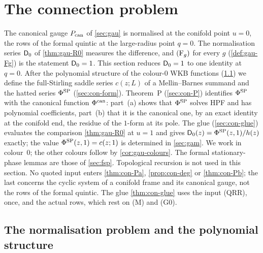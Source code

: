 
\section{The connection problem}
\label{sec:con}

The canonical gauge $P_{\mathrm{can}}$ of \cref{sec:gau} is normalised at the conifold point $u=0$, the rows of the formal quintic at the large-radius point $q=0$. The normalisation series $\mathsf{D}_0$ of \cref{thm:gau-R0} measures the difference, and $(\mathrm{F}_{g})$ for every $g$ (\cref{def:gau-Fg}) is the statement $\mathsf{D}_0=1$. This section reduces $\mathsf{D}_0=1$ to one identity at $q=0$. After the polynomial structure of the colour-$0$ WKB functions (\cref{sec:con-problem}) we define the full-Stirling saddle series $c(z;L)$ of a Mellin--Barnes summand and the hatted series $\Phi^{\mathrm{SP}}$ (\cref{sec:con-form}). Theorem~P (\cref{sec:con-P}) identifies $\Phi^{\mathrm{SP}}$ with the canonical function $\Phi^{\mathrm{can}}$: part~(a) shows that $\Phi^{\mathrm{SP}}$ solves HPF and has polynomial coefficients, part~(b) that it is the canonical one, by an exact identity at the conifold end, the residue of the $1$-form at its pole. The glue (\cref{sec:con-glue}) evaluates the comparison \cref{thm:gau-R0} at $u=1$ and gives $\mathsf{D}_0(z)=\Phi^{\mathrm{SP}}(z,1)/h(z)$ exactly; the value $\Phi^{\mathrm{SP}}(z,1)=c(z;1)$ is determined in \cref{sec:gam}. We work in colour~$0$; the other colours follow by \cref{cor:gau-colours}. The formal stationary-phase lemmas are those of \cref{sec:fsp}. Topological recursion is not used in this section. No quoted input enters \cref{thm:con-Pa}, \cref{prop:con-deg} or \cref{thm:con-Pb}; the last concerns the cyclic system of a conifold frame and its canonical gauge, not the rows of the formal quintic. The glue \cref{thm:con-glue} uses the input (QRR), once, and the actual rows, which rest on (M) and (G0).

\subsection{The normalisation problem and the polynomial structure}
\label{sec:con-problem}


